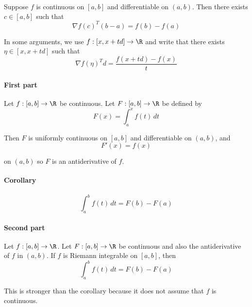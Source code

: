 Suppose $f$ is continuous on $[a,b]$ and differentiable on $(a,b)$.
Then there exists $c\in[a,b]$ such that
$$
	\nabla f(c)^T(b-a)=f(b)-f(a)
$$

In some arguments, we use $f:[x,x+td]\to\R$ and write that there
exists $\eta\in[x,x+td]$ such that
$$
	\nabla f(\eta)^Td=\frac{f(x+td)-f(x)}t
$$

\label{b869dc0}

\paragraph{First part} Let $f:[a,b]\to\R$ be continuous. Let
$F:[a,b]\to\R$ be defined by
$$F(x)=\int_a^xf(t)\,dt$$

Then $F$ is uniformly continuous on $[a,b]$ and differentiable on
$(a,b)$, and
$$F'(x)=f(x)$$

on $(a,b)$ so $F$ is an antiderivative of $f$.

\paragraph{Corollary}
$$\int_a^bf(t)\,dt=F(b)-F(a)$$

\paragraph{Second part} Let $f:[a,b]\to\R$. Let $F:[a,b]\to\R$ be
continuous and also the antiderivative of $f$ in $(a,b)$. If $f$ is
Riemann integrable on $[a,b]$, then
$$\int_a^bf(t)\,dt=F(b)-F(a)$$

This is stronger than the corollary because it does not assume that
$f$ is continuous.
